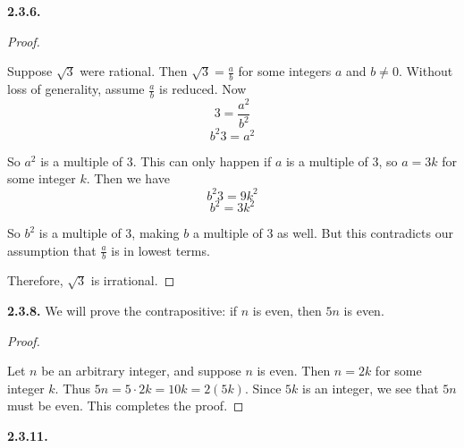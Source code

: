 \documentclass[10pt,]{book}
\theoremstyle{plain}
\theoremstyle{definition}
\theoremstyle{definition}
\theoremstyle{definition}
\theoremstyle{definition}
\numberwithin{equation}{chapter}
\begin{document}
\noindent\textbf{2.3.6.} \begin{proof}\hypertarget{proof-34}{}
\hypertarget{p-1413}{}%
Suppose \(\sqrt{3}\) were rational. Then \(\sqrt{3} = \frac{a}{b}\) for some integers \(a\) and \(b \ne 0\). Without loss of generality, assume \(\frac{a}{b}\) is reduced. Now%
\begin{equation*}
3 = \frac{a^2}{b^2}
\end{equation*}
%
\begin{equation*}
b^2 3 = a^2
\end{equation*}
%
\par
\hypertarget{p-1414}{}%
So \(a^2\) is a multiple of 3. This can only happen if \(a\) is a multiple of 3, so \(a = 3k\) for some integer \(k\). Then we have%
\begin{equation*}
b^2 3 = 9k^2
\end{equation*}
%
\begin{equation*}
b^2 = 3k^2
\end{equation*}
%
\par
\hypertarget{p-1415}{}%
So \(b^2\) is a multiple of 3, making \(b\) a multiple of 3 as well. But this contradicts our assumption that \(\frac{a}{b}\) is in lowest terms.%
\par
\hypertarget{p-1416}{}%
Therefore, \(\sqrt{3}\) is irrational.%
\end{proof}
\par\smallskip
\noindent\textbf{2.3.8.} \hypertarget{p-1422}{}%
We will prove the contrapositive: if \(n\) is even, then \(5n\) is even.%
\begin{proof}\hypertarget{proof-35}{}
\hypertarget{p-1423}{}%
Let \(n\) be an arbitrary integer, and suppose \(n\) is even. Then \(n = 2k\) for some integer \(k\). Thus \(5n = 5\cdot 2k = 10k = 2(5k)\). Since \(5k\) is an integer, we see that \(5n\) must be even. This completes the proof.%
\end{proof}
\par\smallskip
\noindent\textbf{2.3.11.} \hypertarget{p-1428}{}%
\leavevmode%
\end{document}
